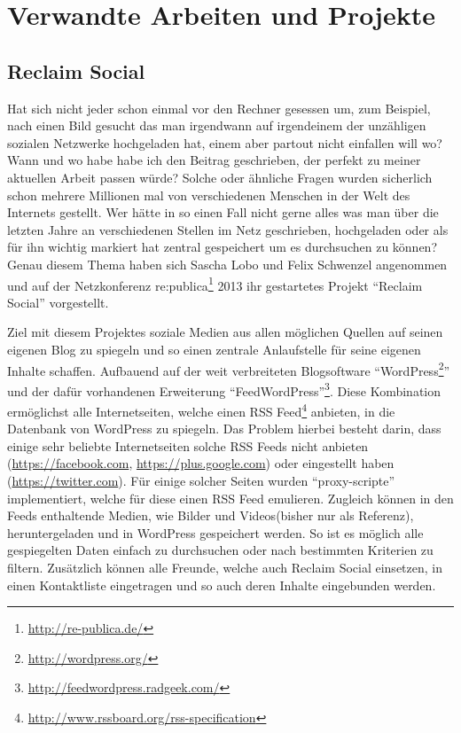 

\section{Verwandte Arbeiten und Projekte} %
\label{sec:verwandte_arbeiten_und_projekte}

\subsection{Reclaim Social} %
\label{sub:verw_arbeiten_reclaim_social}

Hat sich nicht jeder schon einmal vor den Rechner gesessen um, zum Beispiel, nach einen Bild gesucht das man irgendwann auf irgendeinem der unzähligen sozialen Netzwerke hochgeladen hat, einem aber partout nicht einfallen will wo? Wann und wo habe habe ich den Beitrag geschrieben, der perfekt zu meiner aktuellen Arbeit passen würde? Solche oder ähnliche Fragen wurden sicherlich schon mehrere Millionen mal von verschiedenen Menschen in der Welt des Internets gestellt. Wer hätte in so einen Fall nicht gerne alles was man über die letzten Jahre an verschiedenen Stellen im Netz geschrieben, hochgeladen oder als für ihn wichtig markiert hat zentral gespeichert um es durchsuchen zu können? Genau diesem Thema haben sich Sascha Lobo und Felix Schwenzel angenommen und auf der Netzkonferenz re:publica\footnote{\url{http://re-publica.de/}} 2013 ihr gestartetes Projekt \enquote{Reclaim Social} \cite{Schwenzel2013} vorgestellt.


\medskip

Ziel mit diesem Projektes soziale Medien aus allen möglichen Quellen auf seinen eigenen Blog zu spiegeln und so einen zentrale Anlaufstelle für seine eigenen Inhalte schaffen. Aufbauend auf der weit verbreiteten Blogsoftware \enquote{WordPress\footnote{\url{http://wordpress.org/}}} und der dafür vorhandenen Erweiterung \enquote{FeedWordPress}\footnote{\url{http://feedwordpress.radgeek.com/}}. Diese Kombination ermöglichst alle Internetseiten, welche einen RSS Feed\footnote{\url{http://www.rssboard.org/rss-specification}} anbieten, in die Datenbank von WordPress zu spiegeln. Das Problem hierbei besteht darin, dass einige sehr beliebte Internetseiten solche RSS Feeds nicht anbieten (\url{https://facebook.com}, \url{https://plus.google.com}) oder eingestellt haben (\url{https://twitter.com}). Für einige solcher Seiten wurden \enquote{proxy-scripte}\cite[Tecg Specs Details]{Schwenzel2013} implementiert, welche für diese einen RSS Feed emulieren. Zugleich können in den Feeds enthaltende Medien, wie Bilder und Videos(bisher nur als Referenz), heruntergeladen und in WordPress gespeichert werden. So ist es möglich alle gespiegelten Daten einfach zu durchsuchen oder nach bestimmten Kriterien zu filtern. Zusätzlich können alle Freunde, welche auch Reclaim Social einsetzen, in einen Kontaktliste eingetragen und so auch deren Inhalte eingebunden werden.

